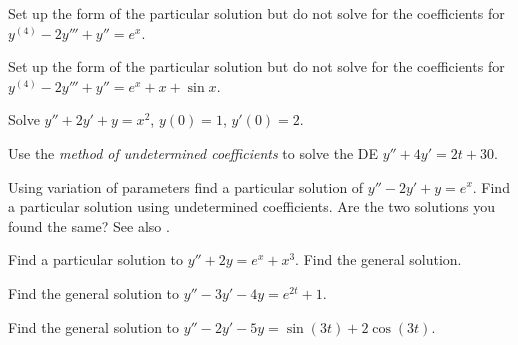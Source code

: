 \begin{exercise}
Set up the form of the particular solution but do not solve
for the coefficients for $y^{(4)}-2y'''+y'' = e^x$.
\end{exercise}

\begin{exercise}
Set up the form of the particular solution but do not solve
for the coefficients for $y^{(4)}-2y'''+y'' = e^x + x + \sin x$.
\end{exercise}

\begin{exercise}\ansMark%
Solve $y''+2y'+y = x^2$, $y(0)=1$, $y'(0)=2$.
\end{exercise}

\begin{exercise}
Use the {\it method of undetermined coefficients} to solve the DE $y''+4y'=2t+30$. %
\end{exercise}

\begin{exercise}
\pagebreak[2]
\leavevmode
\begin{tasks}
\task Using variation of parameters find a particular solution of
$y''-2y'+y = e^x$.
\task Find a particular solution using undetermined
coefficients.
\task Are the two solutions you found the same?
See also .
\end{tasks}
\end{exercise}

\begin{samepage}
\begin{exercise}\ansMark%
\leavevmode
\begin{tasks}
\task Find a particular solution to $y''+2y=e^x + x^3$.
\task Find the general solution.
\end{tasks}
\end{exercise}
\end{samepage}

\begin{exercise}
Find the general solution to $y'' - 3y' - 4y = e^{2t} + 1$.
\end{exercise}

\begin{exercise}
Find the general solution to $y'' - 2y' - 5y = \sin(3t) + 2\cos(3t)$.
\end{exercise}

